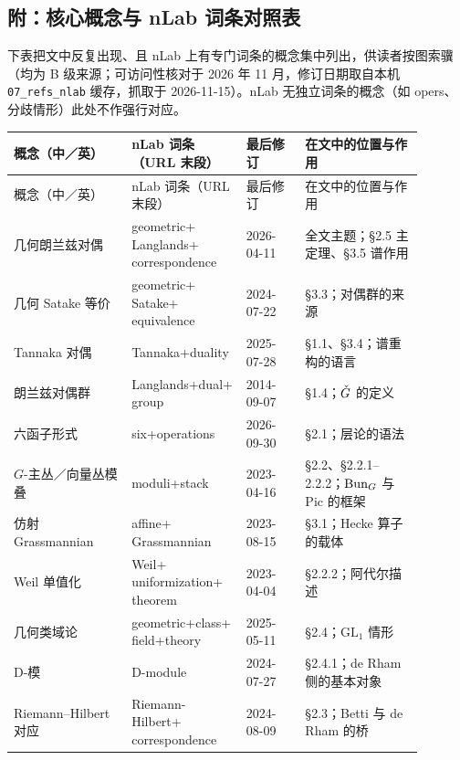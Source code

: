 \subsection*{附：核心概念与 nLab 词条对照表}

下表把文中反复出现、且 nLab 上有专门词条的概念集中列出，供读者按图索骥（均为 B 级来源；可访问性核对于 2026 年 11 月，修订日期取自本机 \texttt{07\_refs\_nlab} 缓存，抓取于 2026-11-15）。nLab 无独立词条的概念（如 opers、分歧情形）此处不作强行对应。

{\small
\begin{longtable}{@{}>{\raggedright\arraybackslash}p{0.26\linewidth}>{\raggedright\arraybackslash}p{0.24\linewidth}>{\raggedright\arraybackslash}p{0.13\linewidth}>{\raggedright\arraybackslash}p{0.26\linewidth}@{}}
\toprule
概念（中／英） & nLab 词条（URL 末段） & 最后修订 & 在文中的位置与作用 \\
\midrule
\endfirsthead
\toprule
概念（中／英） & nLab 词条（URL 末段） & 最后修订 & 在文中的位置与作用 \\
\midrule
\endhead
\bottomrule
\endfoot
几何朗兰兹对偶 & geometric+​\allowbreak Langlands+​\allowbreak correspondence & \mbox{2026-04-11} & 全文主题；§2.5 主定理、§3.5 谱作用 \\
几何 Satake 等价 & geometric+​\allowbreak Satake+​\allowbreak equivalence & \mbox{2024-07-22} & §3.3；对偶群的来源 \\
Tannaka 对偶 & Tannaka+​\allowbreak duality & \mbox{2025-07-28} & §1.1、§3.4；谱重构的语言 \\
朗兰兹对偶群 & Langlands+​\allowbreak dual+​\allowbreak group & \mbox{2014-09-07} & §1.4；$\check{G}$ 的定义 \\
六函子形式 & six+​\allowbreak operations & \mbox{2026-09-30} & §2.1；层论的语法 \\
$G$-主丛／向量丛模叠 & moduli+​\allowbreak stack & \mbox{2023-04-16} & §2.2、§2.2.1--2.2.2；$\operatorname{Bun}_{G}$ 与 $\mathrm{Pic}$ 的框架 \\
仿射 Grassmannian & affine+​\allowbreak Grassmannian & \mbox{2023-08-15} & §3.1；Hecke 算子的载体 \\
Weil 单值化 & Weil+​\allowbreak uniformization+​\allowbreak theorem & \mbox{2023-04-04} & §2.2.2；阿代尔描述 \\
几何类域论 & geometric+​\allowbreak class+​\allowbreak field+​\allowbreak theory & \mbox{2025-05-11} & §2.4；$\mathrm{GL}_{1}$ 情形 \\
D-模 & D-module & \mbox{2024-07-27} & §2.4.1；de Rham 侧的基本对象 \\
Riemann--Hilbert 对应 & Riemann-Hilbert+​\allowbreak correspondence & \mbox{2024-08-09} & §2.3；Betti 与 de Rham 的桥 \\

\end{longtable}}
